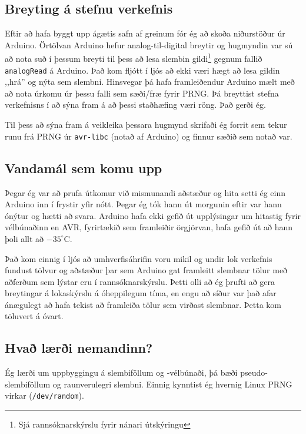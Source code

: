 \documentclass[a4paper]{article}           %
\begin{document}
\subsection{Breyting á stefnu verkefnis}

Eftir að hafa byggt upp ágætis safn af greinum fór ég að skoða niðurstöður úr Arduino. Örtölvan Arduino hefur analog-til-digital breytir og hugmyndin var sú að nota suð í þessum breyti til þess að lesa slembin gildi\footnote{Sjá rannsóknarskýrslu fyrir nánari útskýringu} gegnum fallið \texttt{analogRead} á Arduino. Það kom fljótt í ljós að ekki væri hægt að lesa gildin ,,hrá'' og nýta sem slembni. 
Hinsvegar þá hafa framleiðendur Arduino mælt með að nota úrkomu úr þessu falli sem sæði/fræ fyrir PRNG. Þá breyttist stefna verkefnisns í að sýna fram á að þessi staðhæfing væri röng. Það gerði ég. 

Til þess að sýna fram á veikleika þessara hugmynd skrifaði ég forrit sem tekur runu frá PRNG úr \texttt{avr-libc} (notað af Arduino) og finnur sæðið sem notað var.

\subsection{Vandamál sem komu upp}

Þegar ég var að prufa útkomur við mismunandi aðstæður og hita setti ég einn Arduino inn í frystir yfir nótt. Þegar ég tók hann út morgunin eftir var hann ónýtur og hætti að svara. Arduino hafa ekki gefið út upplýsingar um hitastig fyrir vélbúnaðinn en AVR, fyrirtækið sem framleiðir örgjörvan, hafa gefið út að hann þoli allt að $-35^\circ$C. 

Það kom einnig í ljós að umhverfisáhrifin voru mikil og undir lok verkefnis fundust tölvur og aðstæður þar sem Arduino gat framleitt slembnar tölur með aðferðum sem lýstar eru í rannsóknarskýrslu. Þetti olli að ég þrufti að gera breytingar á lokaskýrslu á óheppilegum tíma, en engu að síður var það afar ánægulegt að hafa tekist að framleiða tölur sem virðast slembnar. Þetta kom töluvert á óvart. 

\subsection{Hvað lærði nemandinn?}

Ég lærði um uppbyggingu á slembiföllum og -vélbúnaði, þá bæði pseudo-slembiföllum og raunverulegri slembni. Einnig kynntist ég hvernig Linux PRNG virkar (\texttt{/dev/random}). 
\end{document}
